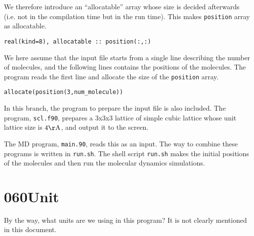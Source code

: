 \documentclass[a4,10pt]{article}
\begin{document}

We therefore introduce an ``allocatable'' array whose size is decided afterwards (i.e. not in the compilation time but in the run time).
This makes {\tt position} array as allocatable.
\begin{screen}\begin{verbatim}
real(kind=8), allocatable :: position(:,:)
\end{verbatim}\end{screen}

We here assume that the input file starts from a single line describing the number of molecules, and the following lines contains the positions of the molecules.
The program reads the first line and allocate the size of the {\tt position} array.
\begin{screen}\begin{verbatim}
allocate(position(3,num_molecule))
\end{verbatim}\end{screen}

In this branch, the program to prepare the input file is also included.  The program, {\tt scl.f90}, prepares a 3x3x3 lattice of simple cubic lattice whose unit lattice size is $4 {\rm \AA}$, and output it to the screen.

The MD program, {\tt main.90}, reads this as an input.  The way to combine these programs is written in {\tt run.sh}.
The shell script {\tt run.sh} makes the initial positions of the molecules and then run the molecular dynamics simulations.


\section{060Unit}

By the way, what units are we using in this program?  It is not clearly mentioned in this document.
\end{document}
